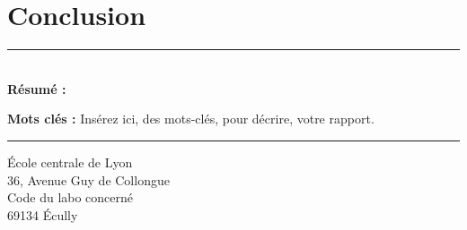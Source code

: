 \documentclass[a4paper,12pt,french]{article}
\begin{document}
\section{Conclusion}
\lipsum[3]


%
%



\newpage
\thispagestyle{empty}

\vspace*{\fill}
\noindent\rule[2pt]{\textwidth}{0.5pt}\\
{\textbf{Résumé :}}
\lipsum[1]

{\noindent\textbf{Mots clés :}}
Insérez ici, des mots-clés, pour décrire, votre rapport.
\\
\noindent\rule[2pt]{\textwidth}{0.5pt}
\begin{center}
  École centrale de Lyon\\
  36, Avenue Guy de Collongue\\
  Code du labo concerné\\
  69134 Écully
\end{center}
\vspace*{\fill}
\end{document}
